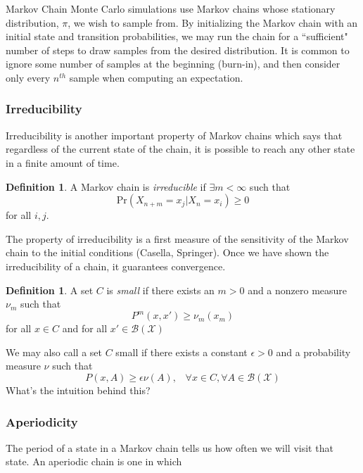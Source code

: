 \documentclass[11pt, a4paper]{article}
\theoremstyle{plain}
\theoremstyle{definition}
\newtheorem{defn}[thm]{Definition} %
\newcommand{\pr}{\mathrm{Pr}}
\begin{document}
Markov Chain Monte Carlo simulations use Markov chains whose stationary distribution, $\pi$, we wish to sample from. By initializing the Markov chain with an initial state and transition probabilities, we may run the chain for a ``sufficient" number of steps to draw samples from the desired distribution. It is common to ignore some number of samples at the beginning (burn-in), and then consider only every $n^{{th}}$ sample when computing an expectation.

\subsubsection{Irreducibility}
Irreducibility is another important property of Markov chains which says that
regardless of the current state of the chain, it is possible to reach any other
state in a finite amount of time.
\begin{defn}
A Markov chain is \emph{irreducible} if $\exists
m < \infty$ such that
$$\pr{(X_{n+m} = x_j | X_n = x_i)} \ge 0$$
for all $i, j$. 
\end{defn}
The property of irreducibility is a first measure of the sensitivity of the Markov chain
to the initial conditions (Casella, Springer). Once we have shown the irreducibility
of a chain, it guarantees convergence.

\begin{defn}
A set $C$ is \emph{small} if there exists an $m > 0$ and a nonzero measure
$\nu_m$ such that $$P^m(x, x') \ge\nu_m(x_{m})$$
for all $x \in C$ and for all $x' \in \mathcal{B}(\mathcal{X})$
\end{defn}
We may also call a set $C$ small if there exists a constant $\epsilon > 0$ and a probability measure 
$\nu$ such that $$P(x, A) \ge \epsilon\nu(A), \hspace{10pt} \forall x\in C, \forall A \in \mathcal{B}(\mathcal{X})$$
What's the intuition behind this?
\subsubsection{Aperiodicity}
The period of a state in a Markov chain tells us
how often we will visit that state. An aperiodic
chain is one in which 
\end{document}
